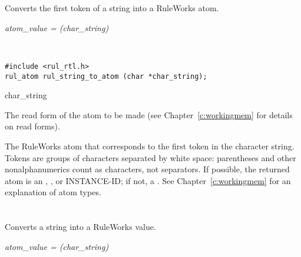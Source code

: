 \section*{}

Converts the first token of a string into a RuleWorks atom.

\Syntax

\it{atom\_value} = (\it{char\_string})

\begin{args}
   \\
\end{args}

\CBinding
\begin{verbatim}
#include <rul_rtl.h>
rul_atom rul_string_to_atom (char *char_string);
\end{verbatim}

\begin{argument}
\item[char\_string]

  The read form of the atom to be made (see Chapter~\ref{c:workingmem}
  for details on read forms).
\end{argument}

\ReturnValue

The RuleWorks atom that corresponds to the first token in the
character string.  Tokens are groups of characters separated by white
space: parentheses and other nonalphanumerics count as characters, not
separators. If possible, the returned atom is an ,
, or INSTANCE-ID; if not, a . See
Chapter~\ref{c:workingmem} for an explanation of atom types.

\begin{seealso}


\end{seealso}

\section*{}

Converts a string into a RuleWorks  value.

\Syntax

\it{atom\_value} = (\it{char\_string})

